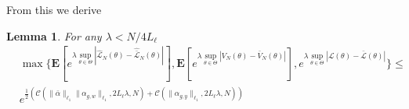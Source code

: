 \documentclass{article}
\def\rve{{\mathbf{e}}}
\newtheorem{lemma}[theorem]{Lemma}
\newcommand{\e}{\mathbf{e}}
\newcommand{\bE}{\mathbf{E}}
\begin{document}
From this we derive
\begin{lemma}
\label{vl-vbl:lemma1}
For any $\lambda < N/4L_{\ell}$ %
\begin{align*} 
& \max\{\bE[e^{\lambda \sup_{\theta \in \Theta} |\hat{\mathcal{L}}_N(\theta) - \hat{\bar{\mathcal{L}}}_N(\theta)|}],
\bE[e^{\lambda \sup_{\theta \in \Theta} |V_N(\theta) - \bar{V}_N(\theta)|}], 
e^{\lambda \sup_{\theta \in \Theta} |\mathcal{L}(\theta) - \mathcal{\bar{L}}(\theta)|}\} \le  \\
& e^{\frac{1}{2} \left( \mathcal{C}(\|\bar{\alpha}\|_{\ell_1} \|\alpha_{g,w}\|_{\ell_1}, 2L_{\ell}\lambda,N)+
\mathcal{C}(\|\alpha_{g,y}\|_{\ell_1}, 2L_{\ell}\lambda,N)\right)} %
\end{align*}
\end{lemma}
\end{document}
